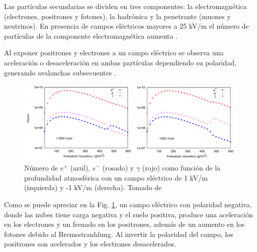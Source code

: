 \documentclass[12pt,a4paper,oneside]{book}
\begin{document}

Las partículas secundarias se dividen en tres componentes: la electromagnética (electrones, positrones y fotones), la hadrónica y la penetrante (muones y neutrinos). En presencia de campos eléctricos mayores a 25 kV/m el número de partículas de la componente electromagnética aumenta \cite{colalillo2019}. 



Al exponer positrones y electrones a un campo eléctrico se observa una aceleración o desaceleración en ambas partículas dependiendo su polaridad, generando avalanchas subsecuentes \cite{zhao2019effects}.\medskip


\begin{figure}[ht]
  \centering
  \includegraphics[width=1\textwidth]{All.png}
  \caption{Número de $e^{+}$ (azul), $e^{-}$ (rosado) y $\gamma$ (rojo) como función de la profundidad atmosférica con un campo eléctrico de 1 kV/m (izquierda) y -1 kV/m (derecha). Tomado de \cite{zhao2019effects} }
  \label{fig22}
\end{figure}

Como se puede apreciar en la Fig. \ref{fig22}, un campo eléctrico con polaridad negativa, donde las nubes tiene carga negativa y el suelo positiva, produce una aceleración en los electrones y un frenado en los positrones, además de un aumento en los fotones debido al Bremsstranhlung. Al invertir la polaridad del campo, los positrones son acelerados y los electrones desacelerados. \medskip
\end{document}
